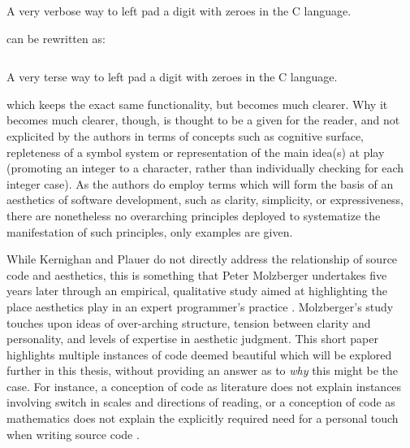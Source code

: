 \begin{listing}
    \inputminted{c}{./corpus/verbose.c}
    \caption{A very verbose way to left pad a digit with zeroes in the C language.}
    \label{code:verbose_c}
\end{listing}

can be rewritten as:

\begin{listing}
    \inputminted{c}{./corpus/verbose_refactored.c}
    \caption{A very terse way to left pad a digit with zeroes in the C language.}
    \label{code:verbose_refactored_c}
\end{listing}

which keeps the exact same functionality, but becomes much clearer. Why it becomes much clearer, though, is thought to be a given for the reader, and not explicited by the authors in terms of concepts such as cognitive surface, repleteness of a symbol system or representation of the main idea(s) at play (promoting an integer to a character, rather than individually checking for each integer case). As the authors do employ terms which will form the basis of an aesthetics of software development, such as clarity, simplicity, or expressiveness, there are nonetheless no overarching principles deployed to systematize the manifestation of such principles, only examples are given.

While Kernighan and Plauer do not directly address the relationship of source code and aesthetics, this is something that Peter Molzberger undertakes five years later through an empirical, qualitative study aimed at highlighting the place aesthetics play in an expert programmer's practice \citep{molzberger_aesthetics_1983}. Molzberger's study touches upon ideas of over-arching structure, tension between clarity and personality, and levels of expertise in aesthetic judgment. This short paper highlights multiple instances of code deemed beautiful which will be explored further in this thesis, without providing an answer as to \emph{why} this might be the case. For instance, a conception of code as literature does not explain instances involving switch in scales and directions of reading, or a conception of code as mathematics does not explain the explicitly required need for a personal touch when writing source code \citep{molzberger_aesthetics_1983}.

